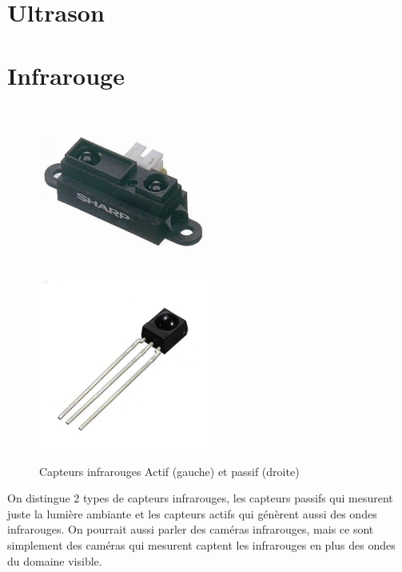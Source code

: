 \documentclass[a4paper, 11pt]{report}
\begin{document}
\section{Ultrason}

\section{Infrarouge}

\begin{figure}[h]
\begin{centering}
\includegraphics[width=0.5\textwidth]{images/capteurInfrarougeActif.jpg}
\includegraphics[width=0.5\textwidth]{images/capteurInfrarougePassif.jpg}
\caption{Capteurs infrarouges Actif (gauche) et passif (droite)}
\par\end{centering}
\end{figure}

On distingue 2 types de capteurs infrarouges, les capteurs passifs qui mesurent juste la lumière ambiante et les capteurs actifs qui génèrent aussi des ondes infrarouges. On pourrait aussi parler des caméras infrarouges, mais ce sont simplement des caméras qui mesurent captent les infrarouges en plus des ondes du domaine visible.
\end{document}
